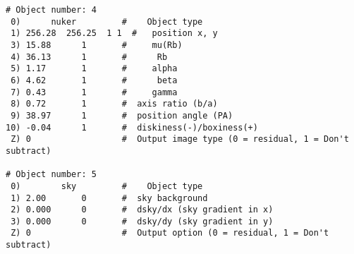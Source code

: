 \documentclass[preprint]{aastex}
\begin{document}
\begin {verbatim}
# Object number: 4
 0)      nuker         #    Object type
 1) 256.28  256.25  1 1  #   position x, y
 3) 15.88      1       #     mu(Rb)
 4) 36.13      1       #      Rb
 5) 1.17       1       #     alpha 
 6) 4.62       1       #      beta 
 7) 0.43       1       #     gamma 
 8) 0.72       1       #  axis ratio (b/a)  
 9) 38.97      1       #  position angle (PA) 
10) -0.04      1       #  diskiness(-)/boxiness(+)
 Z) 0                  #  Output image type (0 = residual, 1 = Don't subtract) 

# Object number: 5
 0)        sky         #    Object type 
 1) 2.00       0       #  sky background 
 2) 0.000      0       #  dsky/dx (sky gradient in x) 
 3) 0.000      0       #  dsky/dy (sky gradient in y) 
 Z) 0                  #  Output option (0 = residual, 1 = Don't subtract) 

\end{verbatim}


\newpage
\normalsize
\end{document}
